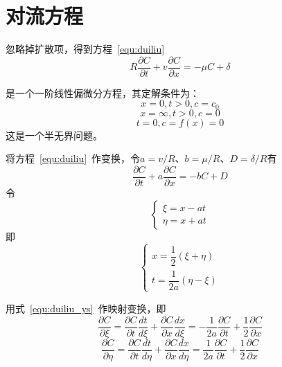 \section{对流方程}
忽略掉扩散项，得到方程~\eqref{equ:duiliu}
\begin{equation}\label{equ:duiliu}
R\dfrac{\partial C}{\partial t}+v\dfrac{\partial C}{\partial x}= -\mu C + \delta
\end{equation}\par
是一个一阶线性偏微分方程，其定解条件为：
\begin{equation}\label{equ:duiliu_bj}
x=0,t>0,c=c_0
\end{equation}
\begin{equation}
x=\infty,t>0,c=0
\end{equation}
\begin{equation}\label{equ:duiliu_init}
t=0,c=f(x)=0
\end{equation}
这是一个半无界问题。\par
将方程~\eqref{equ:duiliu}~作变换，令$a=v/R$、$b=\mu/R$、$D=\delta/R$有
\begin{equation}\label{equ:duiliu_n}
\dfrac{\partial C}{\partial t}+a\dfrac{\partial C}{\partial x}= -b C + D
\end{equation}
令
\begin{equation}\label{equ:duiliu_ys}
\begin{cases}
\xi=x-at \\
\eta=x+at
\end{cases}
\end{equation}
即
\begin{equation}
\begin{cases}
x=\dfrac{1}{2}(\xi+\eta)\\[1.2em]
t=\dfrac{1}{2a}(\eta-\xi)
\end{cases}
\end{equation}\par
用式~\eqref{equ:duiliu_ys}~作映射变换，即
\begin{equation}
\dfrac{\partial C}{\partial \xi}=\dfrac{\partial C}{\partial t}\dfrac{dt}{d\xi}+
								 \dfrac{\partial C}{\partial x}\dfrac{dx}{d\xi}
								=-\dfrac{1}{2a}\dfrac{\partial C}{\partial t}+\dfrac{1}{2}\dfrac{\partial C}{\partial x}						
\end{equation}
\begin{equation}
\dfrac{\partial C}{\partial \eta}=\dfrac{\partial C}{\partial t}\dfrac{dt}{d\eta}+
								 \dfrac{\partial C}{\partial x}\dfrac{dx}{d\eta}
								=\dfrac{1}{2a}\dfrac{\partial C}{\partial t}+
								\dfrac{1}{2}\dfrac{\partial C}{\partial x}		
\end{equation}\par
